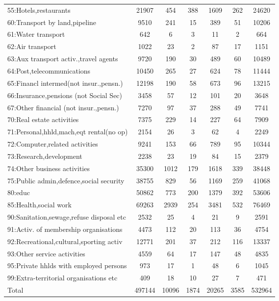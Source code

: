 {\begin{longtable}{l*{6}{c}}
55:Hotels,restaurants&    21907&      454&      388&     1609&      262&    24620\\
60:Transport by land,pipeline&     9510&      241&       15&      389&       51&    10206\\
61:Water transport&      642&        6&        3&       11&        2&      664\\
62:Air transport&     1022&       23&        2&       87&       17&     1151\\
63:Aux transport activ.,travel agents&     9720&      190&       30&      489&       60&    10489\\
64:Post,telecommunications&    10450&      265&       27&      624&       78&    11444\\
65:Financl intermed(not insur.,pensn.)&    12198&      190&       58&      673&       96&    13215\\
66:Insurance,pensions (not Social Sec)&     3458&       57&       12&      101&       20&     3648\\
67:Other financial (not insur.,pensn.)&     7270&       97&       37&      288&       49&     7741\\
70:Real estate activities&     7375&      229&       14&      227&       64&     7909\\
71:Personal,hhld,mach,eqt rental(no op)&     2154&       26&        3&       62&        4&     2249\\
72:Computer,related activities&     9241&      153&       66&      789&       95&    10344\\
73:Research,development&     2238&       23&       19&       84&       15&     2379\\
74:Other business activities&    35300&     1012&      179&     1618&      339&    38448\\
75:Public admin,defence,social security&    38755&      829&       56&     1169&      259&    41068\\
80:educ   &    50862&      773&      200&     1379&      392&    53606\\
85:Health,social work&    69263&     2939&      254&     3481&      532&    76469\\
90:Sanitation,sewage,refuse disposal etc&     2532&       25&        4&       21&        9&     2591\\
91:Activ. of membership organisations&     4473&      112&       20&      113&       36&     4754\\
92:Recreational,cultural,sporting activ&    12771&      201&       37&      212&      116&    13337\\
93:Other service activities&     4559&       64&       17&      147&       48&     4835\\
95:Private hhlds with employed persons&      973&       17&        1&       48&        6&     1045\\
99:Extra-territorial organisations etc&      409&       18&       10&       27&        7&      471\\
Total     &   497144&    10096&     1874&    20265&     3585&   532964\\
\hline\hline
\end{longtable}
\label{tab:2D_industries}
}
